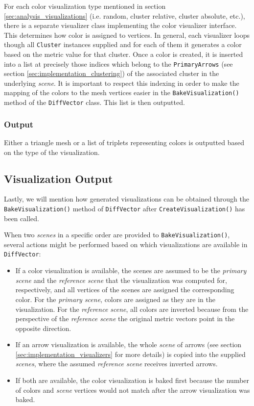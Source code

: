 For each color visualization type mentioned in section \ref{sec:analysis_visualizations} (i.e. random, cluster relative, cluster absolute, etc.), there is a separate visualizer class implementing the color visualizer interface. This determines how color is assigned to vertices. In general, each visualizer loops though all \verb+Cluster+ instances supplied and for each of them it generates a color based on the metric value for that cluster. Once a color is created, it is inserted into a list at precisely those indices which belong to the \verb+PrimaryArrows+ (see section \ref{sec:implementation_clustering}) of the associated cluster in the underlying {\it scene}. It is important to respect this indexing in order to make the mapping of the colors to the mesh vertices easier in the \verb+BakeVisualization()+ method of the \verb+DiffVector+ class. This list is then outputted.

\subsubsection{Output}

Either a triangle mesh or a list of triplets representing colors is outputted based on the type of the visualization.
\subsection{Visualization Output}
\label{sec:implementation-visualizers-output}

Lastly, we will mention how generated visualizations can be obtained through the \verb+BakeVisualization()+ method of \verb+DiffVector+ after \verb+CreateVisualization()+ has been called.

When two {\it scenes} in a specific order are provided to \verb+BakeVisualization()+, several actions might be performed based on which visualizations are available in \verb+DiffVector+:

\begin{itemize}
\item If a color visualization is available, the scenes are assumed to be the {\it primary scene} and the {\it reference scene} that the visualization was computed for, respectively, and all vertices of the scenes are assigned the corresponding color. For the {\it primary scene}, colors are assigned as they are in the visualization. For the {\it reference scene}, all colors are inverted because from the perspective of the {\it reference scene} the original metric vectors point in the opposite direction.
\item If an arrow visualization is available, the whole {\it scene} of arrows (see section \ref{sec:implementation_visualizers} for more details) is copied into the supplied {\it scenes}, where the assumed {\it reference scene} receives inverted arrows.
\item If both are available, the color visualization is baked first because the number of colors and {\it scene} vertices would not match after the arrow visualization was baked.
\end{itemize}


